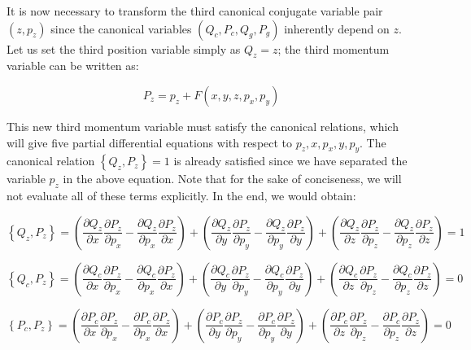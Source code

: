 It is now necessary to transform the third canonical conjugate variable pair $(z,p_z)$ since the canonical variables $(Q_c,P_c,Q_g,P_g)$ inherently depend on $z$. Let us set the third position variable simply as $Q_z=z$; the third momentum variable can be written as:

\begin{equation*}
    P_z=p_z+F(x,y,z,p_x,p_y)
\end{equation*}

This new third momentum variable must satisfy the canonical relations, which will give five partial differential equations with respect to $p_z, x, p_x, y, p_y$. The canonical relation $\left\{Q_z,P_z\right\}=1$ is already satisfied since we have separated the variable $p_z$ in the above equation. Note that for the sake of conciseness, we will not evaluate all of these terms explicitly. In the end, we would obtain:

\iffalse

\begin{equation}
    \label{H-48}
    \left\{Q_z,P_z\right\}=\left(\frac{\partial Q_z}{\partial x}\frac{\partial P_z}{\partial p_x}-\frac{\partial Q_z}{\partial p_x}\frac{\partial P_z}{\partial x}\right)+\left(\frac{\partial Q_z}{\partial y}\frac{\partial P_z}{\partial p_y}-\frac{\partial Q_z}{\partial p_y}\frac{\partial P_z}{\partial y}\right)+\left(\frac{\partial Q_z}{\partial z}\frac{\partial P_z}{\partial p_z}-\frac{\partial Q_z}{\partial p_z}\frac{\partial P_z}{\partial z}\right)=1
\end{equation}

\begin{equation}
    \label{H-49}
    \left\{Q_c,P_z\right\}=\left(\frac{\partial Q_c}{\partial x}\frac{\partial P_z}{\partial p_x}-\frac{\partial Q_c}{\partial p_x}\frac{\partial P_z}{\partial x}\right)+\left(\frac{\partial Q_c}{\partial y}\frac{\partial P_z}{\partial p_y}-\frac{\partial Q_c}{\partial p_y}\frac{\partial P_z}{\partial y}\right)+\left(\frac{\partial Q_c}{\partial z}\frac{\partial P_z}{\partial p_z}-\frac{\partial Q_c}{\partial p_z}\frac{\partial P_z}{\partial z}\right)=0
\end{equation}

\begin{equation}
    \label{H-50}
    \left\{P_c,P_z\right\}=\left(\frac{\partial P_c}{\partial x}\frac{\partial P_z}{\partial p_x}-\frac{\partial P_c}{\partial p_x}\frac{\partial P_z}{\partial x}\right)+\left(\frac{\partial P_c}{\partial y}\frac{\partial P_z}{\partial p_y}-\frac{\partial P_c}{\partial p_y}\frac{\partial P_z}{\partial y}\right)+\left(\frac{\partial P_c}{\partial z}\frac{\partial P_z}{\partial p_z}-\frac{\partial P_c}{\partial p_z}\frac{\partial P_z}{\partial z}\right)=0
\end{equation}

